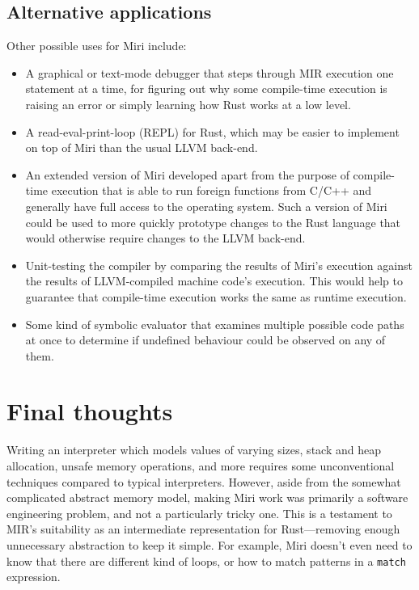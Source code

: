 \documentclass[twocolumn]{article}
\newcommand{\rust}[1]{\texttt{#1}}
\begin{document}
\subsection{Alternative applications}

Other possible uses for Miri include:

\begin{itemize}
  \item A graphical or text-mode debugger that steps through MIR execution one statement at a time,
    for figuring out why some compile-time execution is raising an error or simply learning how Rust
    works at a low level.
  \item A read-eval-print-loop (REPL) for Rust, which may be easier to implement on top of Miri than
    the usual LLVM back-end.
  \item An extended version of Miri developed apart from the purpose of compile-time execution that
    is able to run foreign functions from C/C++ and generally have full access to the operating
    system. Such a version of Miri could be used to more quickly prototype changes to the Rust
    language that would otherwise require changes to the LLVM back-end.
  \item Unit-testing the compiler by comparing the results of Miri's execution against the results
    of LLVM-compiled machine code's execution. This would help to guarantee that compile-time
    execution works the same as runtime execution.
  \item Some kind of symbolic evaluator that examines multiple possible code paths at once to
    determine if undefined behaviour could be observed on any of them.
\end{itemize}


\section{Final thoughts}

Writing an interpreter which models values of varying sizes, stack and heap allocation, unsafe
memory operations, and more requires some unconventional techniques compared to typical
interpreters. However, aside from the somewhat complicated abstract memory model, making Miri work
was primarily a software engineering problem, and not a particularly tricky one. This is a testament
to MIR's suitability as an intermediate representation for Rust---removing enough unnecessary
abstraction to keep it simple. For example, Miri doesn't even need to know that there are different
kind of loops, or how to match patterns in a \rust{match} expression.
\end{document}
